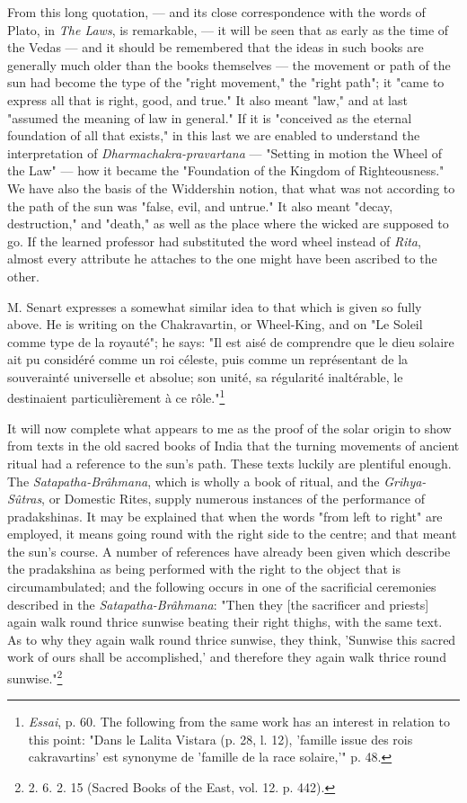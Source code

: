 \documentclass[a4paper, 11pt, oneside, polutonikogreek, english]{article}
\begin{document}
From this long quotation, --- and its close correspondence with the words of Plato, in \emph{The Laws}, is remarkable, --- it will be seen that as early as the time of the Vedas --- and it should be remembered that the ideas in such books are generally much older than the books themselves --- the movement or path of the sun had become the type of the "right movement," the "right path"; it "came to express all that is right, good, and true." It also meant "law," and at last "assumed the meaning of law in general." If it is "conceived as the eternal foundation of all that exists," in this last we are enabled to understand the interpretation of \emph{Dharmachakra-pravartana} --- "Setting in motion the Wheel of the Law" --- how it became the "Foundation of the Kingdom of Righteousness." We have also the basis of the Widdershin notion, that what was not according to the path of the sun was "false, evil, and untrue." It also meant "decay, destruction," and "death," as well as the place where the wicked are supposed to go. If the learned professor had substituted the word wheel instead of \emph{Rita}, almost every attribute he attaches to the one might have been ascribed to the other.

M. Senart expresses a somewhat similar idea to that which is given so fully above. He is writing on the Chakravartin, or Wheel-King, and on "Le Soleil comme type de la royauté"; he says: "Il est aisé de comprendre que le dieu solaire ait pu considéré comme un roi céleste, puis comme un représentant de la souverainté universelle et absolue; son unité, sa régularité inaltérable, le destinaient particulièrement à ce rôle."\footnote{\emph{Essai}, p. 60. The following from the same work has an interest in relation to this point: "Dans le Lalita Vistara (p. 28, l. 12), 'famille issue des rois cakravartins' est synonyme de 'famille de la race solaire,'" p. 48.}

It will now complete what appears to me as the proof of the solar origin to show from texts in the old sacred books of India that the turning movements of ancient ritual had a reference to the sun's path. These texts luckily are plentiful enough. The \emph{Satapatha-Brâhmana}, which is wholly a book of ritual, and the \emph{Grihya-Sûtras}, or Domestic Rites, supply numerous instances of the performance of pradakshinas. It may be explained that when the words "from left to right" are employed, it means going round with the right side to the centre; and that meant the sun's course. A number of references have already been given which describe the pradakshina as being performed with the right to the object that is circumambulated; and the following occurs in one of the sacrificial ceremonies described in the \emph{Satapatha-Brâhmana}: "Then they [the sacrificer and priests] again walk round thrice sunwise beating their right thighs, with the same text. As to why they again walk round thrice sunwise, they think, 'Sunwise this sacred work of ours shall be accomplished,' and therefore they again walk thrice round sunwise."\footnote{2. 6. 2. 15 (Sacred Books of the East, vol. 12. p. 442).}
\end{document}
